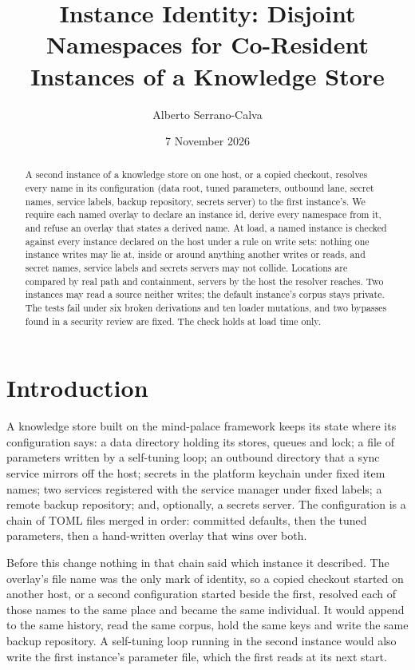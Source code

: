 \documentclass[11pt]{article}
\title{Instance Identity: Disjoint Namespaces for Co-Resident Instances of a Knowledge Store}
\author{Alberto Serrano-Calva}
\date{7 November 2026}
\theoremstyle{plain}
\theoremstyle{definition}
\theoremstyle{remark}
\begin{document}
\maketitle

\begin{abstract}
A second instance of a knowledge store on one host, or a copied checkout, resolves every name in
its configuration (data root, tuned parameters, outbound lane, secret names, service labels, backup
repository, secrets server) to the first instance's. We require each named overlay to declare an
instance id, derive every namespace from it, and refuse an overlay that states a derived name. At
load, a named instance is checked against every instance declared on the host under a rule on
write sets: nothing one instance writes may lie at, inside or around anything another writes or
reads, and secret names, service labels and secrets servers may not collide. Locations are compared
by real path and containment, servers by the host the resolver reaches. Two instances may read a
source neither writes; the default instance's corpus stays private. The tests fail under six broken
derivations and ten loader mutations, and two bypasses found in a security review are fixed. The
check holds at load time only.
\end{abstract}

\section{Introduction}

A knowledge store built on the mind-palace framework keeps its state where its configuration says:
a data directory holding its stores, queues and lock; a file of parameters written by a self-tuning
loop; an outbound directory that a sync service mirrors off the host; secrets in the platform
keychain under fixed item names; two services registered with the service manager under fixed
labels; a remote backup repository; and, optionally, a secrets server. The configuration is a chain
of TOML files merged in order: committed defaults, then the tuned parameters, then a hand-written
overlay that wins over both.

Before this change nothing in that chain said which instance it described. The overlay's file name
was the only mark of identity, so a copied checkout started on another host, or a second
configuration started beside the first, resolved each of those names to the same place and became
the same individual. It would append to the same history, read the same corpus, hold the same keys
and write the same backup repository. A self-tuning loop running in the second instance would also
write the first instance's parameter file, which the first reads at its next start.
\end{document}
